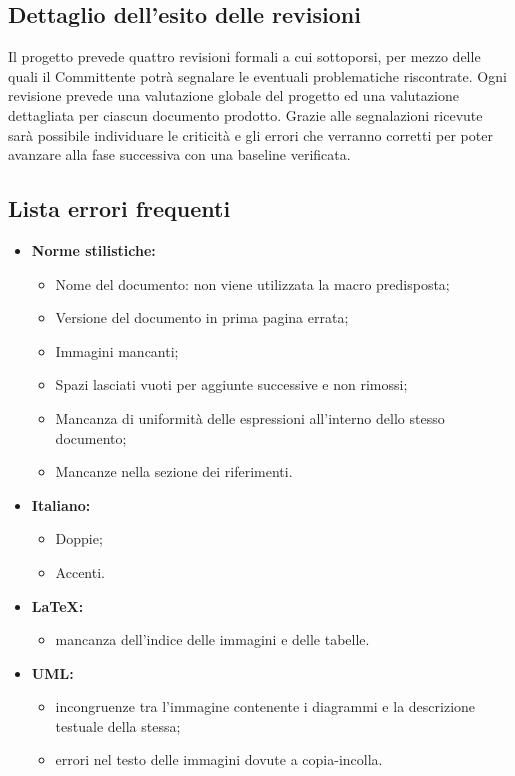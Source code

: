 \documentclass[a4paper]{article}
\begin{document}
	\subsection{Dettaglio dell'esito delle revisioni}
			Il progetto prevede quattro revisioni formali a cui sottoporsi, per mezzo delle quali il Committente potrà segnalare 
			le eventuali problematiche riscontrate. Ogni revisione prevede una valutazione globale del progetto ed una valutazione 
			dettagliata per ciascun documento prodotto. Grazie alle segnalazioni ricevute sarà possibile individuare le criticità 
			e gli errori che verranno corretti per poter avanzare alla fase successiva con una baseline verificata.
			
			\subsection{Lista errori frequenti}
			\begin{itemize}
					\item \textbf{Norme stilistiche:}
					\begin{itemize}
						\item Nome del documento: non viene utilizzata la macro predisposta;
						\item Versione del documento in prima pagina errata;
						\item Immagini mancanti;
						\item Spazi lasciati vuoti per aggiunte successive e non rimossi;
						\item Mancanza di uniformità delle espressioni all'interno dello stesso documento;
						\item Mancanze nella sezione dei riferimenti.
					\end{itemize}
					\item \textbf{Italiano:}
					\begin{itemize}
						\item Doppie;
						\item Accenti.
					\end{itemize}
					\item \textbf{\LaTeX :}
					\begin{itemize}
						\item mancanza dell'indice delle immagini e delle tabelle.
					\end{itemize}
					\item \textbf{UML:}
					\begin{itemize}
						\item incongruenze tra l'immagine contenente i diagrammi e la descrizione testuale della stessa;
						\item errori nel testo delle immagini dovute a copia-incolla.
					\end{itemize}
				\end{itemize}
				
\cleardoublepage
	\listoffigures
	
	\cleardoublepage
	\listoftables	
\end{document}
